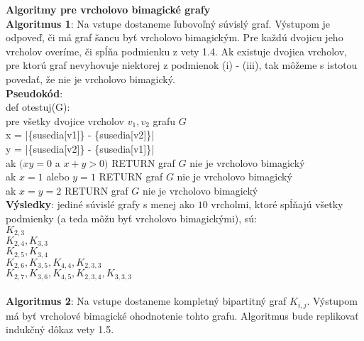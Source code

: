 \documentclass[12pt]{article}
\begin{document}
\textbf{Algoritmy pre vrcholovo bimagické grafy} \\
 
\textbf{Algoritmus 1}: Na vstupe dostaneme ľubovoľný súvislý graf. Výstupom je odpoveď, či má graf šancu byť vrcholovo bimagickým. Pre každú dvojicu jeho vrcholov overíme, či spĺňa podmienku z vety 1.4. Ak existuje dvojica vrcholov, pre ktorú graf nevyhovuje niektorej z podmienok (i) - (iii), tak môžeme s istotou povedať, že nie je vrcholovo bimagický. \\

\textbf{Pseudokód}: \\
def otestuj(G): \\
pre všetky dvojice vrcholov $v_1, v_2$ grafu $G$ \\
x = |\{susedia[v1]\} - \{susedia[v2]\}| \\
y = |\{susedia[v2]\} - \{susedia[v1]\}| \\
ak $(xy = 0$ a $x+y > 0)$ RETURN graf $G$ nie je vrcholovo bimagický \\
ak $x = 1$ alebo $y = 1$ RETURN graf $G$ nie je vrcholovo bimagický \\
ak $x = y = 2$ RETURN graf $G$ nie je vrcholovo bimagický \\

\textbf{Výsledky}: jediné súvislé grafy s menej ako $10$ vrcholmi, ktoré spĺňajú všetky podmienky (a teda môžu byť vrcholovo bimagickými), sú: \\
$K_{2,3}$ \\
$K_{2,4}, K_{3,3}$ \\
$K_{2,5}, K_{3,4}$ \\
$K_{2,6}, K_{3,5}, K_{4,4}, K_{2,3,3}$ \\
$K_{2,7}, K_{3,6}, K_{4,5}, K_{2,3,4}, K_{3,3,3}$ \\\\

\textbf{Algoritmus 2}: Na vstupe dostaneme kompletný bipartitný graf $K_{i,j}$. Výstupom má byť vrcholové bimagické ohodnotenie tohto grafu. Algoritmus bude replikovať indukčný dôkaz vety 1.5. \\
\end{document}

